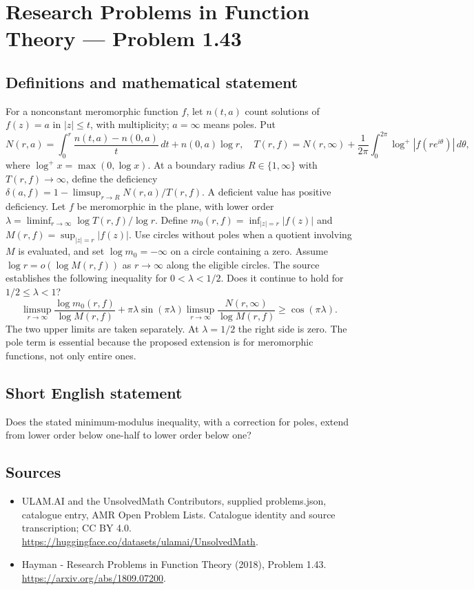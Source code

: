 \documentclass[11pt,a4paper]{article}
\begin{document}
\section*{Research Problems in Function Theory — Problem 1.43}\label{statement}

\subsection{Definitions and mathematical statement}
For a nonconstant meromorphic function $f$, let $n(t,a)$ count solutions of $f(z)=a$ in $|z|\le t$, with multiplicity; $a=\infty$ means poles. Put
\[
N(r,a)=\int_0^r\frac{n(t,a)-n(0,a)}t\,dt+n(0,a)\log r,
\quad T(r,f)=N(r,\infty)+\frac1{2\pi}\int_0^{2\pi}\log^+|f(re^{i\theta})|\,d\theta,
\]
where $\log^+x=\max(0,\log x)$. At a boundary radius $R\in\{1,\infty\}$ with $T(r,f)\to\infty$, define the deficiency
$\delta(a,f)=1-\limsup_{r\to R}N(r,a)/T(r,f)$. A deficient value has positive deficiency.
Let $f$ be meromorphic in the plane, with lower order
$\lambda=\liminf_{r\to\infty}\log T(r,f)/\log r$. Define
$m_0(r,f)=\inf_{|z|=r}|f(z)|$ and $M(r,f)=\sup_{|z|=r}|f(z)|$.
Use circles without poles when a quotient involving $M$ is evaluated, and set $\log m_0=-\infty$ on a circle containing a zero. Assume
$\log r=o(\log M(r,f))$ as $r\to\infty$ along the eligible circles.
The source establishes the following inequality for $0<\lambda<1/2$. Does it continue to hold for $1/2\le\lambda<1$?
\[
\limsup_{r\to\infty}\frac{\log m_0(r,f)}{\log M(r,f)}
+\pi\lambda\sin(\pi\lambda)
\limsup_{r\to\infty}\frac{N(r,\infty)}{\log M(r,f)}
\ge\cos(\pi\lambda).
\]
The two upper limits are taken separately. At $\lambda=1/2$ the right side is zero. The pole term is essential because the proposed extension is for meromorphic functions, not only entire ones.
\subsection{Short English statement}
Does the stated minimum-modulus inequality, with a correction for poles, extend from lower order below one-half to lower order below one?
\subsection{Sources}
\begin{itemize}
\item[S1] ULAM.AI and the UnsolvedMath Contributors, supplied problems.json, catalogue entry, AMR Open Problem Lists. Catalogue identity and source transcription; CC BY 4.0.
\url{https://huggingface.co/datasets/ulamai/UnsolvedMath}.
\item[S2] Hayman - Research Problems in Function Theory (2018), Problem 1.43. 
\url{https://arxiv.org/abs/1809.07200}.
\end{itemize}
\end{document}
